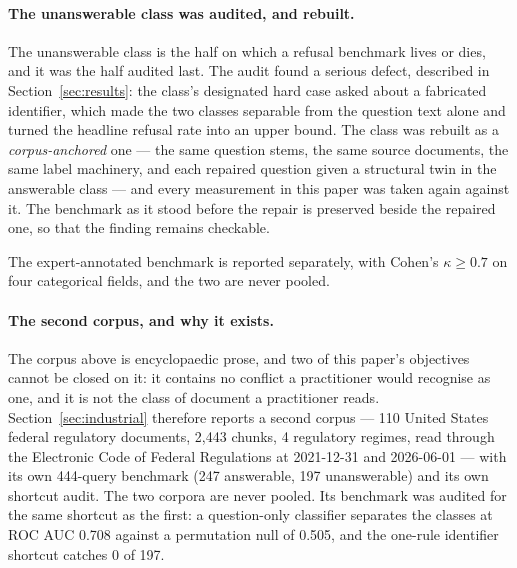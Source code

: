 \documentclass[preprint,3p,times]{elsarticle}
\begin{document}
\paragraph{The unanswerable class was audited, and rebuilt.} The unanswerable
class is the half on which a refusal benchmark lives or dies, and it was the
half audited last. The audit found a serious defect, described in
Section~\ref{sec:results}: the class's designated hard case asked about a
fabricated identifier, which made the two classes separable from the question
text alone and turned the headline refusal rate into an upper bound. The
class was rebuilt as a \emph{corpus-anchored} one --- the same question stems,
the same source documents, the same label machinery, and each repaired
question given a structural twin in the answerable class --- and every
measurement in this paper was taken again against it. The benchmark as it
stood before the repair is preserved beside the repaired one, so that the
finding remains checkable.

The expert-annotated benchmark is reported separately, with Cohen's
$\kappa\geq0.7$ on four categorical fields, and the two are never pooled.

\paragraph{The second corpus, and why it exists.} The corpus above is
encyclopaedic prose, and two of this paper's objectives cannot be closed on
it: it contains no conflict a practitioner would recognise as one, and it is
not the class of document a practitioner reads. Section~\ref{sec:industrial}
therefore reports a second corpus --- 110 United States
federal regulatory documents, 2,443 chunks, 4
regulatory regimes, read through the Electronic Code of Federal Regulations at
2021-12-31 and 2026-06-01 --- with its own
444-query benchmark (247 answerable,
197 unanswerable) and its own shortcut audit. The two
corpora are never pooled. Its benchmark was audited for the same shortcut as
the first: a question-only classifier separates the classes at ROC AUC
0.708 against a permutation null of
0.505, and the one-rule identifier shortcut catches
0 of 197.
\end{document}
